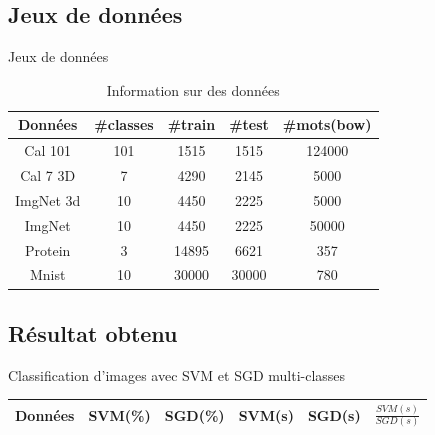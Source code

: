 \documentclass[11pt]{beamer}
\begin{document}
\begin{otherlanguage}{french}
\subsection{Jeux de données}
\begin{frame}{Jeux de données}
\begin{table}
\begin{center}
    \begin{tabular}{ | c | c | c | c | c |}
    \hline
    Données & \#classes & \#train & \#test & \#mots(bow) \\ \hline

    Cal 101 & 101 & 1515 & 1515 & 124000 \\ \hline

    Cal 7 3D & 7 & 4290 & 2145 & 5000 \\ \hline 

    ImgNet 3d & 10 & 4450 & 2225 & 5000 \\ \hline

    ImgNet & 10 & 4450 & 2225 & 50000 \\ \hline
    
    Protein & 3 & 14895 & 6621 & 357 \\ \hline
    
    Mnist & 10 & 30000 & 30000 & 780 \\ \hline

    \end{tabular}
\end{center}
\caption{Information sur des données}
\label{tab:infod1}
\end{table}
\end{frame}


\subsection{Résultat obtenu}
\begin{frame}{Classification d'images avec SVM et SGD multi-classes}

\begin{table}
\begin{center}
    \begin{tabular}{ | c | c | c | c | c | c |}
    \hline
    Données & SVM(\%) & SGD(\%) & SVM(s) & SGD(s) & $\frac{SVM(s)}{SGD(s)}$ \\ \hline


\end{tabular}
\end{center}
\end{table}
\end{frame}
\end{otherlanguage}
\end{document}

